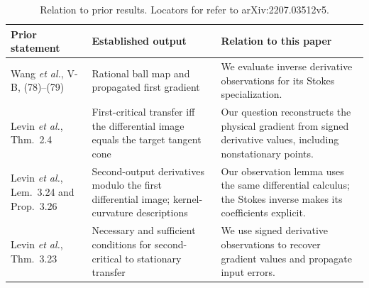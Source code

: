 \documentclass[10pt,a4paper]{article}
\begin{document}
\begin{table}[H]
\caption{Relation to prior results. Locators for \cite{supp-lifts} refer to arXiv:2207.03512v5.}
\label{tab:priorart}
\centering\small\renewcommand{\arraystretch}{1.12}
\begin{tabularx}{\textwidth}{@{}p{}p{}X@{}}\toprule
Prior statement & Established output & Relation to this paper\\\midrule
Wang \emph{et al.}, V-B, (78)--(79) \cite{supp-gcopter} & Rational ball map and propagated first gradient & We evaluate inverse derivative observations for its Stokes specialization.\\
Levin \emph{et al.}, Thm.~2.4 \cite{supp-lifts} & First-critical transfer iff the differential image equals the target tangent cone & Our question reconstructs the physical gradient from signed derivative values, including nonstationary points.\\
Levin \emph{et al.}, Lem.~3.24 and Prop.~3.26 \cite{supp-lifts} & Second-output derivatives modulo the first differential image; kernel-curvature descriptions & Our observation lemma uses the same differential calculus; the Stokes inverse makes its coefficients explicit.\\
Levin \emph{et al.}, Thm.~3.23 \cite{supp-lifts} & Necessary and sufficient conditions for second-critical to stationary transfer & We use signed derivative observations to recover gradient values and propagate input errors.\\\bottomrule
\end{tabularx}
\end{table}
\end{document}
